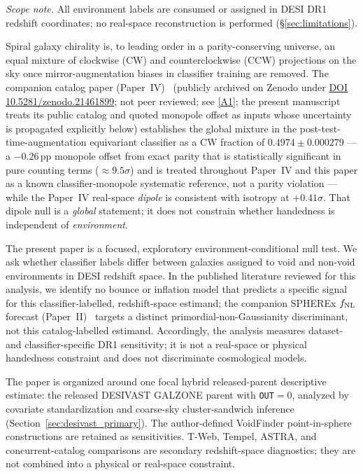 \documentclass[twocolumn,linenumbers]{aastex702}
\newcommand{\repoBase}{https://github.com/Hubify-Projects/bigbounce/blob/main}
\newcommand{\paperIVarxiv}{publicly archived on Zenodo under
\href{https://doi.org/10.5281/zenodo.21461899}{DOI 10.5281/zenodo.21461899};
not peer reviewed}
\begin{document}
\emph{Scope note.} All environment labels are consumed or assigned in DESI
DR1 redshift coordinates; no real-space reconstruction is performed
(\S\ref{sec:limitations}).

Spiral galaxy chirality is, to leading order in a parity-conserving
universe, an equal mixture of clockwise (CW) and counterclockwise (CCW)
projections on the sky once mirror-augmentation biases in classifier
training are removed. The companion catalog paper (Paper~IV)~\cite{golden_chirality_2026}
(\paperIVarxiv;
see \href{\repoBase/pipelines/p2\_chirality/}{[A1]}; the present manuscript
treats its public catalog and quoted monopole offset as inputs whose
uncertainty is propagated explicitly below)
establishes the global mixture in the post-test-time-augmentation
equivariant classifier as a CW fraction of $0.4974 \pm 0.000279$ ---
a $-0.26$\,pp monopole offset from exact parity that is statistically
significant in pure counting terms ($\approx\!9.5\sigma$) and is treated
throughout Paper~IV and this paper as a known classifier-monopole
systematic reference, not a parity violation --- while the Paper~IV
real-space \emph{dipole} is consistent with isotropy at $+0.41\sigma$.
That dipole null is a \emph{global} statement; it
does not constrain whether handedness is independent of
\emph{environment}.

The present paper is a focused, exploratory environment-conditional null
test. We ask whether classifier labels differ between galaxies assigned
to void and non-void environments in DESI redshift space. In the published
literature reviewed for this analysis, we identify no bounce or inflation
model that predicts a specific signal for this classifier-labelled,
redshift-space estimand; the companion SPHEREx $f_{\rm NL}$ forecast (Paper~II)~\cite{golden_fnl_2026} targets a distinct primordial-non-Gaussianity discriminant, not this catalog-labelled estimand. Accordingly, the analysis measures dataset- and
classifier-specific DR1 sensitivity; it is not a real-space or physical
handedness constraint and does not discriminate cosmological models.

The paper is organized around one focal hybrid released-parent descriptive estimate:
the released DESIVAST GALZONE parent with \texttt{OUT}$=0$, analyzed by
covariate standardization and coarse-sky cluster-sandwich inference
(Section~\ref{sec:desivast_primary}). The author-defined VoidFinder
point-in-sphere constructions are retained as sensitivities. T-Web,
Tempel, ASTRA, and concurrent-catalog comparisons are secondary
redshift-space diagnostics; they are not combined into a physical or
real-space constraint.
\end{document}
